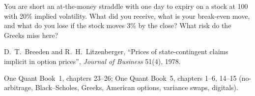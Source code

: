 \begin{interviewq}\label{iq:iv:options-and-derivatives:14}
You are short an at-the-money straddle with one day to expiry on a stock at 100 with 20\% implied volatility. What did
you receive, what is your break-even move, and what do you lose if the stock moves 3\% by the close? What risk do the
Greeks miss here?
\end{interviewq}

\begin{omsources}
\item D.~T.~Breeden and R.~H.~Litzenberger, ``Prices of state-contingent claims implicit in option prices'',
\emph{Journal of Business} 51(4), 1978.
\item One Quant Book~1, chapters 23--26; One Quant Book~5, chapters 1--6, 14--15 (no-arbitrage, Black--Scholes, Greeks,
American options, variance swaps, digitals).
\end{omsources}
